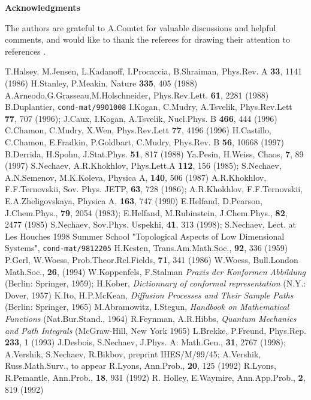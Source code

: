 {\bf Acknowledgments}
\medskip

The authors are grateful to A.Comtet for valuable discussions and helpful
comments, and would like to thank the referees for drawing their attention to
references  \cite{lyons,pem,holley}.

\begin{thebibliography}{99}
 T.Halsey, M.Jensen, L.Kadanoff, I.Procaccia,
B.Shraiman, Phys.Rev. A {\bf 33}, 1141 (1986)
 H.Stanley, P.Meakin, Nature {\bf 335}, 405 (1988)
 A.Arneodo,G.Grasseau,M.Holschneider, Phys.Rev.Lett. {\bf
61}, 2281 (1988)
 B.Duplantier, {\tt cond-mat/9901008}
 I.Kogan, C.Mudry, A.Tsvelik, Phys.Rev.Lett {\bf 77}, 707
(1996); J.Caux, I.Kogan, A.Tsvelik, Nucl.Phys. B {\bf 466}, 444 (1996)
 C.Chamon, C.Mudry, X.Wen, Phys.Rev.Lett {\bf 77}, 4196
(1996)
 H.Castillo, C.Chamon, E.Fradkin, P.Goldbart, C.Mudry,
Phys.Rev. B {\bf 56}, 10668 (1997)
 B.Derrida, H.Spohn, J.Stat.Phys. {\bf 51}, 817 (1988)
 Ya.Pesin, H.Weiss, Chaos, {\bf 7}, 89 (1997)
 S.Nechaev, A.R.Khokhlov, Phys.Lett.A {\bf 112}, 156 
(1985); S.Nechaev, A.N.Semenov, M.K.Koleva, Physica A, {\bf 140}, 506 (1987)
 A.R.Khokhlov, F.F.Ternovskii, Sov. Phys. JETP, {\bf 63}, 
728 (1986); A.R.Khokhlov, F.F.Ternovskii, E.A.Zheligovskaya, Physica A, 
{\bf 163}, 747 (1990)
 E.Helfand, D.Pearson, J.Chem.Phys., {\bf 79}, 2054 
(1983); E.Helfand, M.Rubinstein, J.Chem.Phys., {\bf 82}, 2477 (1985)
 S.Nechaev, Sov.Phys. Uspekhi, {\bf 41}, 313 (1998);
S.Nechaev, Lect. at Les Houches 1998 Summer School "Topological Aspects of Low 
Dimensional Systems", {\tt cond-mat/9812205}
 H.Kesten, Trans.Am.Math.Soc., {\bf 92}, 336 (1959)
 P.Gerl, W.Woess, Prob.Theor.Rel.Fields, {\bf 71}, 341 (1986)
 W.Woess, Bull.London Math.Soc., {\bf 26}, (1994)
 W.Koppenfels, F.Stalman {\it Praxis der Konformen Abbildung} 
(Berlin: Springer, 1959); H.Kober, {\it Dictionnary of conformal 
representation} (N.Y.: Dover, 1957)
 K.Ito, H.P.McKean, {\it Diffusion Processes and Their 
Sample Paths} (Berlin: Springer, 1965) 
 M.Abramowitz, I.Stegun, {\it Handbook on Mathematical 
Functions} (Nat.Bur.Stand., 1964) 
 R.Feynman, A.R.Hibbs, {\it Quantum Mechanics and Path 
Integrals} (McGraw-Hill, New York 1965)
 L.Brekke, P.Freund, Phys.Rep. {\bf 233}, 1 (1993)
 J.Desbois, S.Nechaev, J.Phys. A: Math.Gen., {\bf 
31}, 2767 (1998); A.Vershik, S.Nechaev, R.Bikbov, preprint IHES/M/99/45; 
A.Vershik, Russ.Math.Surv., to appear 
 R.Lyons, Ann.Prob., {\bf 20}, 125 (1992)
 R.Lyons, R.Pemantle, Ann.Prob., {\bf 18}, 931 (1992)
 R. Holley, E.Waymire, Ann.App.Prob., {\bf 2}, 819 (1992)
 

\end{thebibliography}





